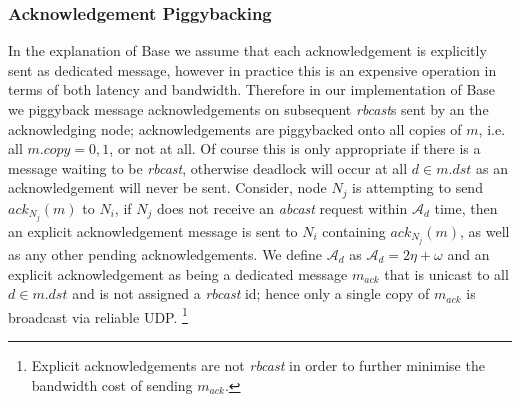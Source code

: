     \subsubsection*{Acknowledgement Piggybacking}\label{ssec:base_ack_piggyback}
    In the explanation of \textsf{Base} we assume that each acknowledgement is explicitly sent as dedicated message, however in practice this is an expensive operation in terms of both latency and bandwidth.  Therefore in our implementation of \textsf{Base} we piggyback message acknowledgements on subsequent \emph{rbcast}s sent by an the acknowledging node; acknowledgements are piggybacked onto all copies of $m$, i.e. all $m.copy =0, 1$, or not at all.  Of course this is only appropriate if there is a message waiting to be \emph{rbcast}, otherwise deadlock will occur at all $d \in m.dst$ as an acknowledgement will never be sent.  Consider, node $N_j$ is attempting to send $ack_{N_j}(m)$ to $N_i$, if $N_j$ does not receive an \emph{abcast} request within $\mathcal{A}_d$ time, then an explicit acknowledgement message is sent to $N_i$ containing $ack_{N_j}(m)$, as well as any other pending acknowledgements.  We define $\mathcal{A}_d$ as $\mathcal{A}_d = 2\eta + \omega$ and an explicit acknowledgement as being a dedicated message $m_{ack}$ that is unicast to all $d \in m.dst$ and is not assigned a \emph{rbcast} id; hence only a single copy of $m_{ack}$ is broadcast via reliable UDP.  \footnote{Explicit acknowledgements are not \emph{rbcast} in order to further minimise the bandwidth cost of sending $m_{ack}$.}
    
%    


